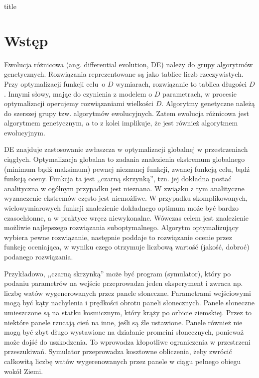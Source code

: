 \documentclass[a4paper,onecolumn,oneside,11pt,wide,floatssmall]{mwrep}
\theoremstyle{definition}
\theoremstyle{plain}%
\theoremstyle{remark}
\begin{document}
\renewcommand*\lstlistingname{Wydruk}
\renewcommand*\lstlistlistingname{Spis wydruków}

\renewcommand{\baselinestretch}{1.0}
\raggedbottom
 {title}

\tableofcontents

\newpage
{}
\setcounter{page}{1}

\chapter{Wstęp}

Ewolucja różnicowa (ang. differential evolution, DE) należy do grupy algorytmów genetycznych. \cite{storn}
Rozwiązania reprezentowane są jako tablice liczb rzeczywistych. 
Przy optymalizacji funkcji celu o $D$ wymiarach, rozwiązanie to tablica długości $D$.
Innymi słowy, mając do czynienia z modelem o $D$ parametrach, w procesie optymalizacji operujemy 
rozwiązaniami wielkości $D$. 
Algorytmy genetyczne należą do szerszej grupy tzw. algorytmów ewolucyjnych. \cite{jarabas} 
Zatem ewolucja różnicowa jest algorytmem genetycznym, a to z kolei implikuje, 
że jest również algorytmem ewolucyjnym. 

DE znajduje zastosowanie zwłaszcza w optymalizacji globalnej 
w przestrzeniach ciągłych. Optymalizacja globalna to zadania znalezienia ekstremum globalnego 
(minimum bądź maksimum) pewnej nieznanej funkcji, zwanej funkcją celu, bądź funkcją oceny. 
Funkcja ta jest ,,czarną skrzynką'', tzn. jej dokładna postać analityczna w ogólnym przypadku 
jest nieznana. W związku z tym analityczne wyznaczenie ekstremów często jest niemożliwe. W przypadku 
skomplikowanych, wielowymiarowych funkcji znalezienie dokładnego optimum może być bardzo czasochłonne, 
a w praktyce wręcz niewykonalne. Wówczas celem jest znalezienie możliwie najlepszego rozwiązania
suboptymalnego. Algorytm optymalizujący wybiera pewne rozwiązanie, następnie poddaje to rozwiązanie 
ocenie przez funkcję oceniająca, w wyniku czego otrzymuje liczbową wartość (jakość, dobroć) 
podanego rozwiązania. 

Przykładowo, ,,czarną skrzynką'' może być program (symulator), który po podaniu 
parametrów na wejście przeprowadza jeden eksperyment i zwraca np. liczbę watów wygenerowanych
przez panele słoneczne. Parametrami wejściowymi mogą być kąty nachylenia i prędkości obrotu paneli 
słonecznych. Panele słoneczne umieszczone są na statku kosmicznym, który krąży po orbicie ziemskiej.
Przez to niektóre panele rzucają cień na inne, jeśli są źle ustawione. Panele również nie mogą być 
zbyt długo wystawione na działanie promeini słonecznych, ponieważ może dojść do uszkodzenia. 
To wprowadza kłopotliwe ograniczenia w przestrzeni przeszukiwań.
Symulator przeprowadza kosztowne obliczenia, żeby zwrócić całkowitą liczbę watów wygerenowanych
przez panele w ciągu pełnego obiegu wokół Ziemi. 
\end{document}
